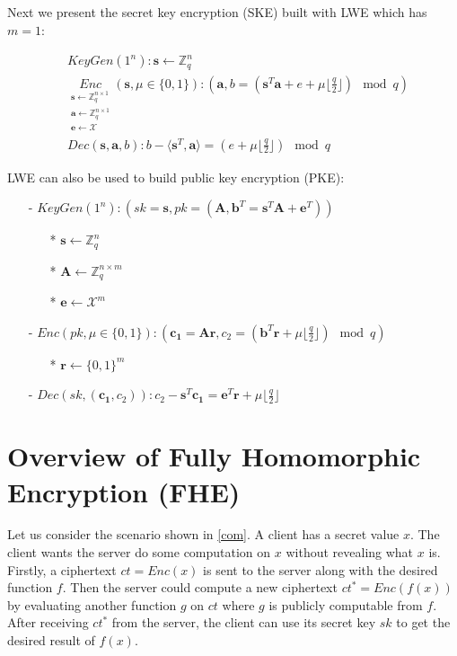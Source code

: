 \documentclass[usletter]{article}
\begin{document}
Next we present the secret key encryption (SKE) built with LWE which has $m=1$:

\begin{align*}
& KeyGen(1^n): \pmb{s}\leftarrow\mathbb{Z}_q^n\\
&\underset{\substack{
\pmb{s}\leftarrow \mathbb{Z}_q^{n\times1}\\
\pmb{a}\leftarrow\mathbb{Z}_q^{n\times 1}\\
\pmb{e}\leftarrow \mathcal{X}}}{Enc}(\pmb{s},\mu\in\{0,1\}): (\pmb{a}, b = (\pmb{s}^T\pmb{a}+e+\mu\lfloor\frac{q}{2}\rfloor)\mod q)\\
&Dec(\pmb{s},\pmb{a},b): b-\langle\pmb{s}^T,\pmb{a}\rangle=(e+\mu\lfloor\frac{q}{2}\rfloor) \mod q
\end{align*}

LWE can also be used to build public key encryption (PKE):
\begin{itemize}
\item[-]  $KeyGen(1^n): (sk=\pmb{s},pk=(\pmb{A}, \pmb{b}^T=\pmb{s}^T\pmb{A}+\pmb{e}^T))$
\begin{itemize}
\item[*]  $\pmb{s}\leftarrow\mathbb{Z}_q^n$
\item[*] $\pmb{A}\leftarrow\mathbb{Z}_q^{n\times m}$
\item[*] $\pmb{e}\leftarrow\mathcal{X}^m$
\end{itemize}

\item[-]  $Enc(pk,\mu\in\{0,1\}): (\pmb{c_1}=\pmb{A}\pmb{r}, c_2=(\pmb{b}^T\pmb{r}+\mu\lfloor\frac{q}{2}\rfloor)\mod q)$
\begin{itemize}
\item[*]  $\pmb{r}\longleftarrow\{0,1\}^m$
\end{itemize}

\item[-]  $Dec(sk,(\pmb{c_1},c_2)): c_2-\pmb{s}^T\pmb{c_1}=\pmb{e}^T\pmb{r}+\mu\lfloor\frac{q}{2}\rfloor$
\end{itemize}


\section{Overview of Fully Homomorphic Encryption (FHE)}

Let us consider the scenario shown in \ref{com}. A client has a secret value $x$. The client wants the server do some computation on $x$ without revealing what $x$ is. Firstly, a ciphertext $ct=Enc(x)$ is sent to the server along with the desired function $f$. Then the server could compute a new ciphertext $ct^*=Enc(f(x))$ by evaluating another function $g$ on $ct$ where $g$ is publicly computable from $f$. After receiving $ct^*$ from the server, the client can use its secret key $sk$ to get the desired result of $f(x)$.
\end{document}
